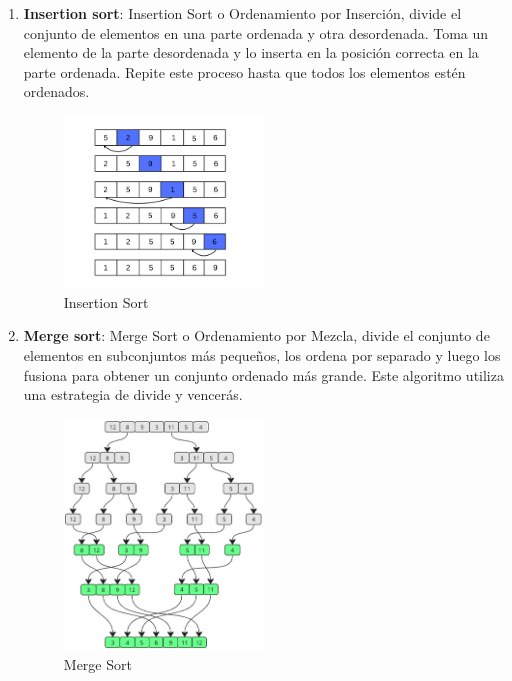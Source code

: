 \begin{enumerate}
    \item \textbf{Insertion sort}:
    Insertion Sort o Ordenamiento por Inserción, divide el conjunto de elementos en una parte ordenada y otra desordenada. 
    Toma un elemento de la parte desordenada y lo inserta en la posición correcta en la parte ordenada. Repite este proceso hasta que todos los elementos estén ordenados.
    \begin{figure}[H]
        \centering %
        \includegraphics[width=0.5\textwidth]{./src/images/InsertionSort.png} %
        \caption{Insertion Sort} %
        \label{fig:imagen 3} %
    \end{figure}
    \newpage

    \item \textbf{Merge sort}:
    Merge Sort o Ordenamiento por Mezcla, divide el conjunto de elementos en subconjuntos más pequeños, 
    los ordena por separado y luego los fusiona para obtener un conjunto ordenado más grande. 
    Este algoritmo utiliza una estrategia de divide y vencerás.
    \begin{figure}[H]
        \centering %
        \includegraphics[width=0.5\textwidth]{./src/images/MergeSort.png} %
        \caption{Merge Sort} %
        \label{fig:imagen 4} %
    \end{figure}


\end{enumerate}
